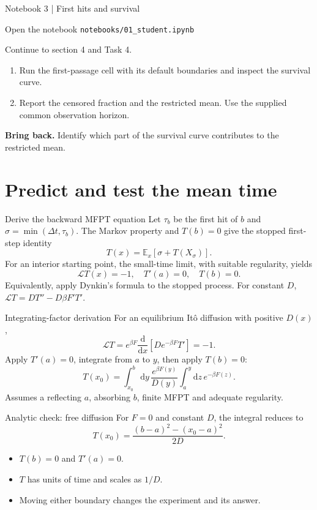 \documentclass[aspectratio=169,10pt]{beamer}
\newcommand{\E}{\mathbb{E}}
\newcommand{\dd}{\mathrm{d}}
\begin{document}
\begin{frame}{Notebook 3 | First hits and survival}
\begin{block}{Open the notebook}
\texttt{notebooks/01\_student.ipynb}\par
Continue to section 4 and Task 4.
\end{block}
\begin{enumerate}
\item Run the first-passage cell with its default boundaries and inspect the survival curve.
\item Report the censored fraction and the restricted mean. Use the supplied common observation horizon.
\end{enumerate}
\textbf{Bring back.} Identify which part of the survival curve contributes to the restricted mean.
\end{frame}

\section{Predict and test the mean time}
\begin{frame}{Derive the backward MFPT equation}
Let $\tau_b$ be the first hit of $b$ and $\sigma=\min(\Delta t,\tau_b)$. The Markov property and $T(b)=0$ give the stopped first-step identity
\[T(x)=\E_x\!\left[\sigma+T(X_\sigma)\right].\]
For an interior starting point, the small-time limit, with suitable regularity, yields
\[\boxed{\mathcal LT(x)=-1,\quad T'(a)=0,\quad T(b)=0.}\]
Equivalently, apply Dynkin's formula to the stopped process. For constant $D$, $\mathcal LT=DT''-D\beta F'T'$.
\end{frame}

\begin{frame}{Integrating-factor derivation}
For an equilibrium It\^o diffusion with positive $D(x)$,
\[\mathcal LT=e^{\beta F}\frac{\dd}{\dd x}\!\left[D e^{-\beta F}T'\right]=-1.\]
Apply $T'(a)=0$, integrate from $a$ to $y$, then apply $T(b)=0$:
\[\boxed{T(x_0)=\int_{x_0}^{b}\!\dd y\,\frac{e^{\beta F(y)}}{D(y)}\int_a^y\!\dd z\,e^{-\beta F(z)}.}\]
Assumes a reflecting $a$, absorbing $b$, finite MFPT and adequate regularity.
\end{frame}

\begin{frame}{Analytic check: free diffusion}
For $F=0$ and constant $D$, the integral reduces to
\[\boxed{T(x_0)=\frac{(b-a)^2-(x_0-a)^2}{2D}.}\]
\begin{itemize}\item $T(b)=0$ and $T'(a)=0$.\item $T$ has units of time and scales as $1/D$.\item Moving either boundary changes the experiment and its answer.\end{itemize}
\end{frame}
\end{document}
